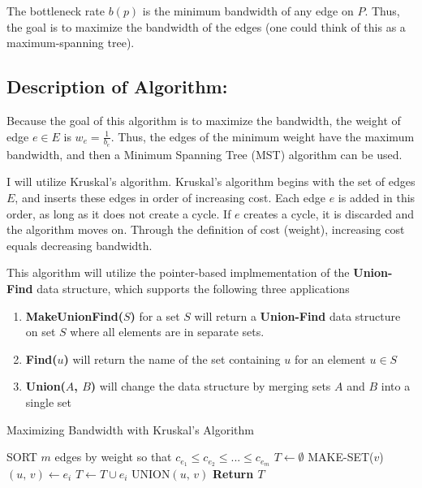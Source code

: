 \documentclass{article}
\begin{document}
The bottleneck rate $b(p)$ is the minimum bandwidth of any edge on $P$.   Thus, the goal is to maximize the bandwidth of the edges (one could think of this as a maximum-spanning tree).

\subsection*{Description of Algorithm:}
Because the goal of this algorithm is to maximize the bandwidth, the weight of edge $e \in E$ is $w_e = \frac{1}{b_e}$.  Thus, the edges of the minimum weight have the maximum bandwidth, and then a Minimum Spanning Tree (MST) algorithm can be used.

I will utilize Kruskal's algorithm.  Kruskal's algorithm begins with the set of edges $E$, and inserts these edges in order of increasing cost.  Each edge $e$ is added in this order, as long as it does not create a cycle.  If $e$ creates a cycle, it is discarded and the algorithm moves on. Through the definition of cost (weight), increasing cost equals decreasing bandwidth. 

This algorithm will utilize the pointer-based implmementation of the \textbf{Union-Find} data structure, which supports the following three applications \cite{algDesign}
\begin{enumerate}
	\item \textbf{MakeUnionFind($S$)} for a set $S$ will return a \textbf{Union-Find} data structure on set $S$ where all elements are in separate sets.
	\item \textbf{Find($u$)} will return the name of the set containing $u$ for an element $u \in S$
	\item \textbf{Union($A$, $B$)} will change the data structure by merging sets $A$ and $B$ into a single set
\end{enumerate}

\begin{algorithm} %
\caption{Maximizing Bandwidth with Kruskal's Algorithm} %
\begin{algorithmic} %
   \State SORT $m$ edges by weight so that $c_{e_1} \leq c_{e_2} \leq ... \leq c_{e_m}$
   \State $T \gets \emptyset$
   		\State MAKE-SET($v$)
   \EndFor
   		\State $(u, \, v) \gets e_i$
   			\State $T \gets T \cup {e_i} $
   			\State UNION$(u, \, v)$ 
   		\EndIf
   \EndFor
   \State \textbf{Return $T$ }
   
\end{algorithmic}
\end{algorithm}
\end{document}
